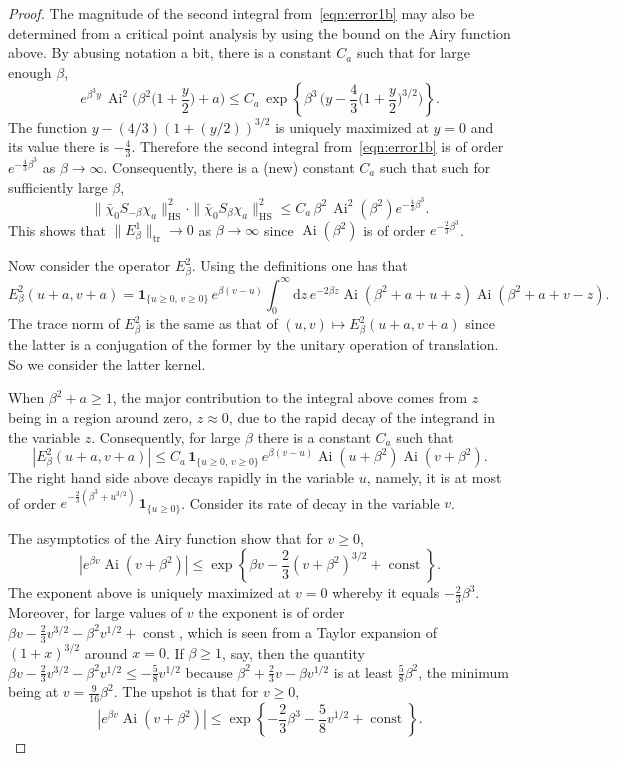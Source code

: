 \documentclass[10pt]{amsart}
\theoremstyle{definition}\newtheorem{defi}[theo]{Definition}\newtheorem{rema}[theo]{Remark}\newtheorem{exam}[theo]{Example}\newtheorem{exem}[theo]{Example}\newtheorem{nota}[theo]{Notation}
\newcommand*{\dd}{\mathrm{d}}
\newcommand*{\dz}{\dd z}
\DeclareMathOperator{\tr}{tr}
\DeclareMathOperator{\hs}{HS}
\DeclareMathOperator{\Ai}{Ai}
\DeclareMathOperator{\const}{const}
\newcommand{\ind}[1]{\mathbf{1}_{\{ #1 \}}}
\begin{document}
\begin{proof}
The magnitude of the second integral from~\eqref{eqn:error1b} may also be determined from a critical point analysis by using the bound on the Airy function above. By abusing notation a bit, there is a constant $C_a$ such that for large enough $\beta$,
\[
e^{\beta^3 y} \, \Ai^2 \Big(\beta^2\Big(1 + \frac{y}{2}\Big) + a \Big) \leq C_a\,
\exp \left \{ \beta^3 \, \Big (y - \frac{4}{3} \Big(1+ \frac{y}{2}\Big)^{3/2} \Big) \right \}.
\]
The function $y - (4/3)(1+ (y/2))^{3/2}$ is uniquely maximized at $y = 0$ and its value there is $-\frac{4}{3}$. Therefore the second integral from~\eqref{eqn:error1b} is of order $e^{-\frac{4}{3}\beta^3}$ as $\beta \to \infty$. Consequently, there is a (new) constant $C_a$ such that such for sufficiently large $\beta$,
\[
\| \bar{\chi}_0 S_{-\beta} \chi_a\|^2_{\hs} \cdot \| \bar{\chi}_0 S_{\beta} \chi_a \|^2_{\hs} \leq
C_a \, \beta^2 \, \Ai^2(\beta^2) e^{-\frac{4}{3}\beta^3}.
\]
This shows that $\|E^1_{\beta}\|_{\tr} \to 0$ as $\beta \to \infty$ since $\Ai(\beta^2)$ is of order $e^{-\frac{2}{3}\beta^3}$.

Now consider the operator $E^2_{\beta}$. Using the definitions one has that
\[
E^2_{\beta}(u+a,v+a) = \ind{u\geq 0, \, v\geq 0} \, e^{\beta(v-u)}
\int_0^{\infty} \dz\, e^{-2\beta z} \Ai(\beta^2 +a +u +z) \Ai(\beta^2+a +v-z).
\]
The trace norm of $E^2_{\beta}$ is the same as that of $(u,v) \mapsto E^2_{\beta}(u+a,v+a)$ since the latter is a conjugation of the former by the unitary operation of translation. So we consider the latter kernel.

When $\beta^2 + a \geq 1$, the major contribution to the integral above comes from $z$ being in a region around zero, $z \approx 0$, due to the rapid decay of the integrand in the variable $z$. Consequently, for large $\beta$ there is a constant $C_a$ such that
\begin{equation}\label{eqn:error1c}
|E^2_{\beta}(u+a, v+a)| \leq C_a\, \ind{u \geq 0, \, v \geq 0} \, e^{\beta(v-u)} \Ai(u+\beta^2) \Ai(v+\beta^2).
\end{equation}
The right hand side above decays rapidly in the variable $u$, namely, it is at most of order $e^{-\frac{2}{3} (\beta^3 + u^{3/2})}\, \ind{u \geq 0}$. Consider its rate of decay in the variable $v$.

The asymptotics of the Airy function show that for $v \geq 0$,
\[
|e^{\beta v} \Ai(v+\beta^2)| \leq \exp \left \{ \beta v - \frac{2}{3}(v+\beta^2)^{3/2} + \const \right \}.
\]
The exponent above is uniquely maximized at $v = 0$ whereby it equals $-\frac{2}{3}\beta^3$. Moreover, for large values of $v$ the exponent is of order $\beta v -\frac{2}{3} v^{3/2} -\beta^2 v^{1/2} + \const$, which is seen from a Taylor expansion of $(1+x)^{3/2}$ around $x =0$. If $\beta \geq 1$, say, then the quantity $\beta v -\frac{2}{3} v^{3/2} -\beta^2 v^{1/2} \leq - \frac{5}{8} v^{1/2}$ because $\beta^2 + \frac{2}{3} v - \beta v^{1/2}$ is at least $\frac{5}{8}\beta^2$, the minimum being at $v = \frac{9}{16}\beta^2$. The upshot is that for $v \geq 0$,
\[
|e^{\beta v} \Ai(v+\beta^2)| \leq \exp \left \{ - \frac{2}{3}\beta^3 -\frac{5}{8}v^{1/2} + \const \right \}.
\]


\end{proof}
\end{document}
